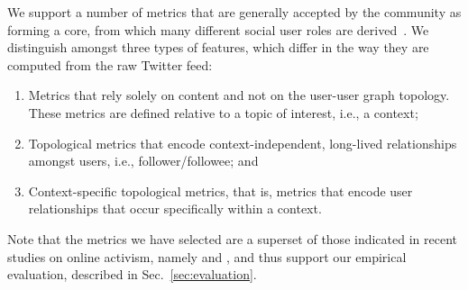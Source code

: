 \documentclass[runningheads]{llncs}
\begin{document}
We support a number of metrics that are generally accepted by the community as forming a core, from which many different social user roles are derived~\cite{RIQUELME2016949}. 
We distinguish amongst three types of features, which differ in the way they are computed from the raw Twitter feed:
\begin{enumerate}
	\item Metrics  that rely solely on content and not on the user-user graph topology. These metrics are defined relative to a topic of interest, i.e., a context;
	\item Topological metrics that encode context-independent, long-lived relationships amongst users, i.e., follower/followee; and 
	\item Context-specific topological metrics, that is, metrics that encode user relationships that occur specifically within a context.
\end{enumerate}

Note that the metrics we have selected are a superset of those indicated in recent studies on online activism, namely \cite{Lotan2011} and  \cite{Poell2014}, and thus support our empirical evaluation, described in  Sec.~\ref{sec:evaluation}.\\
\end{document}
